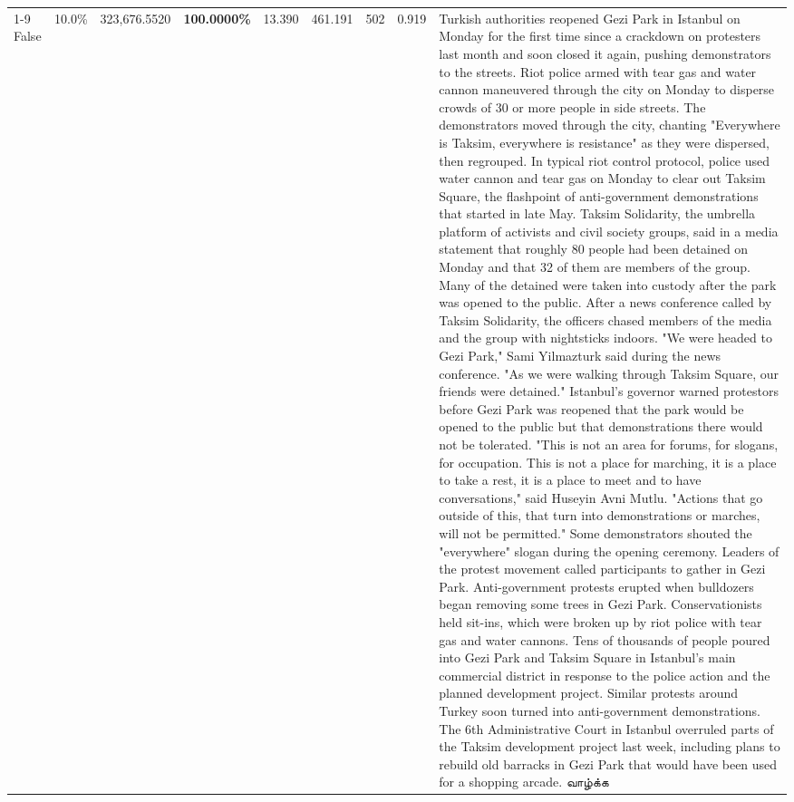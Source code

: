 \begin{table}[H]
\begin{tabular}{lllrlllll}
\cline{1-9}
False & 10.0\% & 323,676.5520 & \bfseries \color{red} 100.0000\% & 13.390 & 461.191 & 502 & 0.919 & Turkish authorities reopened Gezi Park in Istanbul on Monday for the first time since a crackdown on protesters last month and soon closed it again, pushing demonstrators to the streets. Riot police armed with tear gas and water cannon maneuvered through the city on Monday to disperse crowds of 30 or more people in side streets. The demonstrators moved through the city, chanting "Everywhere is Taksim, everywhere is resistance" as they were dispersed, then regrouped. In typical riot control protocol, police used water cannon and tear gas on Monday to clear out Taksim Square, the flashpoint of anti-government demonstrations that started in late May. Taksim Solidarity, the umbrella platform of activists and civil society groups, said in a media statement that roughly 80 people had been detained on Monday and that 32 of them are members of the group. Many of the detained were taken into custody after the park was opened to the public. After a news conference called by Taksim Solidarity, the officers chased members of the media and the group with nightsticks indoors. "We were headed to Gezi Park," Sami Yilmazturk said during the news conference. "As we were walking through Taksim Square, our friends were detained." Istanbul's governor warned protestors before Gezi Park was reopened that the park would be opened to the public but that demonstrations there would not be tolerated. "This is not an area for forums, for slogans, for occupation. This is not a place for marching, it is a place to take a rest, it is a place to meet and to have conversations," said Huseyin Avni Mutlu. "Actions that go outside of this, that turn into demonstrations or marches, will not be permitted." Some demonstrators shouted the "everywhere" slogan during the opening ceremony. Leaders of the protest movement called participants to gather in Gezi Park. Anti-government protests erupted when bulldozers began removing some trees in Gezi Park. Conservationists held sit-ins, which were broken up by riot police with tear gas and water cannons. Tens of thousands of people poured into Gezi Park and Taksim Square in Istanbul's main commercial district in response to the police action and the planned development project. Similar protests around Turkey soon turned into anti-government demonstrations. The 6th Administrative Court in Istanbul overruled parts of the Taksim development project last week, including plans to rebuild old barracks in Gezi Park that would have been used for a shopping arcade. வாழ்க்க \\

\end{tabular}
\end{table}
